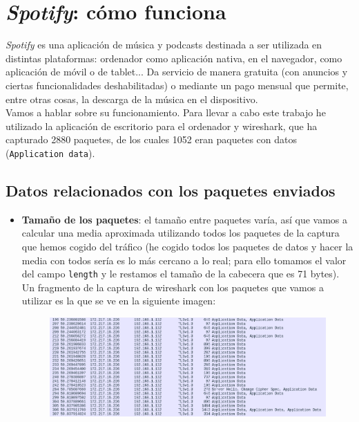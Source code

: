 \documentclass[11pt,a4paper]{article}
\begin{document}

\newpage

\section*{\textit{Spotify}: cómo funciona}

\textit{Spotify} es una aplicación de música y podcasts destinada a ser utilizada en distintas plataformas: ordenador como aplicación nativa, en el navegador, como aplicación de móvil o de tablet... Da servicio de manera gratuita (con anuncios y ciertas funcionalidades deshabilitadas) o mediante un pago mensual que permite, entre otras cosas, la descarga de la música en el dispositivo.\\

Vamos a hablar sobre su funcionamiento. Para llevar a cabo este trabajo he utilizado la aplicación de escritorio para el ordenador y wireshark, que ha capturado 2880 paquetes, de los cuales 1052 eran paquetes con datos (\texttt{Application data}).

\subsection*{Datos relacionados con los paquetes enviados}

\begin{itemize}
	\item \textbf{Tamaño de los paquetes}: el tamaño entre paquetes varía, así que vamos a calcular una media aproximada utilizando todos los paquetes de la captura que hemos cogido del tráfico (he cogido todos los paquetes de datos y hacer la media con todos sería es lo más cercano a lo real; para ello tomamos el valor del campo \texttt{length} y le restamos el tamaño de la cabecera que es 71 bytes).\\
	
	Un fragmento de la captura de wireshark con los paquetes que vamos a utilizar es la que se ve en la siguiente imagen:
	
	\begin{figure}[H]
		\centering
		\includegraphics[scale=0.3]{img/paquetes-media.png}
	\end{figure}
\end{itemize}
\end{document}
